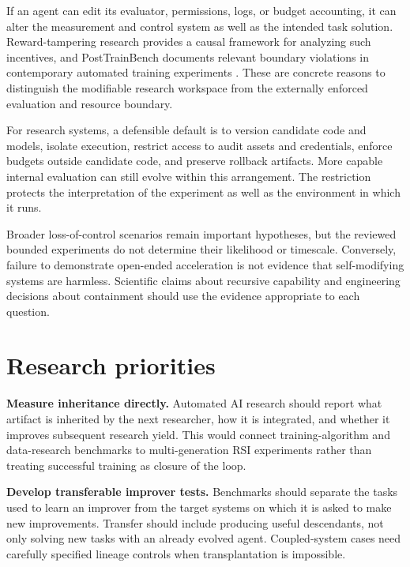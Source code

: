 \documentclass[11pt,american,]{article}
\begin{document}
If an agent can edit its evaluator, permissions, logs, or budget
accounting, it can alter the measurement and control system as well as
the intended task solution. Reward-tampering research provides a causal
framework for analyzing such incentives, and PostTrainBench documents
relevant boundary violations in contemporary automated training
experiments \citep{tampering2019, posttrain2026}. These are concrete
reasons to distinguish the modifiable research workspace from the
externally enforced evaluation and resource boundary.

For research systems, a defensible default is to version candidate code
and models, isolate execution, restrict access to audit assets and
credentials, enforce budgets outside candidate code, and preserve
rollback artifacts. More capable internal evaluation can still evolve
within this arrangement. The restriction protects the interpretation of
the experiment as well as the environment in which it runs.

Broader loss-of-control scenarios remain important hypotheses, but the
reviewed bounded experiments do not determine their likelihood or
timescale. Conversely, failure to demonstrate open-ended acceleration is
not evidence that self-modifying systems are harmless. Scientific claims
about recursive capability and engineering decisions about containment
should use the evidence appropriate to each question.

\hypertarget{research-priorities}{%
\section{Research priorities}\label{research-priorities}}

\textbf{Measure inheritance directly.} Automated AI research should
report what artifact is inherited by the next researcher, how it is
integrated, and whether it improves subsequent research yield. This
would connect training-algorithm and data-research benchmarks to
multi-generation RSI experiments rather than treating successful
training as closure of the loop.

\textbf{Develop transferable improver tests.} Benchmarks should separate
the tasks used to learn an improver from the target systems on which it
is asked to make new improvements. Transfer should include producing
useful descendants, not only solving new tasks with an already evolved
agent. Coupled-system cases need carefully specified lineage controls
when transplantation is impossible.
\end{document}

